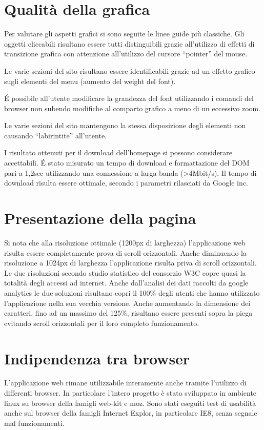 \documentclass[a4paper,12pt,hidelinks]{report}
\begin{document}
\section*{Qualità della grafica}
Per valutare gli aspetti grafici si sono seguite le linee guide più classiche.
Gli oggetti cliccabili risultano essere tutti distinguibili grazie all'utilizzo di effetti di transizione grafica con attenzione all'utilizzo del cursore ``pointer'' del mouse.
\par Le varie sezioni del sito risultano essere identificabili grazie ad un effetto grafico sugli elementi del menu (aumento del weight del font).
\par \'E possibile all'utente modificare la grandezza del font utilizzando i comandi del browser non subendo modifiche al comparto grafico a meno di un eccessivo zoom.
\par Le varie sezioni del sito mantengono la stessa disposizione degli elementi non causando ``labirintite'' all'utente.
\par I risultato ottenuti per il download dell'homepage si possono considerare accettabili. \'E stato misurato un tempo di download e formattazione del DOM pari a 1,2sec utilizzando
una connessione a larga banda (>4Mbit/s). Il tempo di download risulta essere ottimale, secondo i parametri rilasciati da Google inc.
\newpage
\section*{Presentazione della pagina}
Si nota che alla risoluzione ottimale (1200px di larghezza) l'applicazione web risulta essere completamente prova di scroll orizzontali.
Anche diminuendo la risoluzione a 1024px di larghezza l'applicazione risulta priva di scroll orizzontali. Le due risoluzioni secondo studio statistico del consorzio W3C 
copre quasi la totalità degli accessi ad internet. Anche dall'analisi dei dati raccolti da google analytics le due soluzioni risultano copri il 100\% degli utenti che hanno
utilizzato l'applicazione nella sua vecchia versione.
Anche aumentando la dimensione dei caratteri, fino ad un massimo del 125\%, risultano essere presenti sopra la piega evitando scroll orizzontali per il loro completo funzionamento.
\newpage
\section*{Indipendenza tra browser}
L'applicazione web rimane utilizzabile interamente anche tramite l'utilizzo di differenti browser. In particolare l'intero progetto è stato sviluppato in ambiente linux su browser
della famigli web-kit e moz. Sono stati eseguiti test di usabilità anche sul browser della famigli Internet Explor, in particolare IE8, senza segnale mal funzionamenti.
\end{document}
